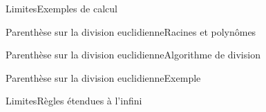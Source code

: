 \documentclass[french,t,handout,xcolor=svgnames]{beamer}
\begin{document}
\begin{frame}{Limites}{Exemples de calcul}
  
\end{frame}
\begin{frame}{Parenthèse sur la division euclidienne}{Racines et polynômes}%
  
  
\end{frame}
\begin{frame}{Parenthèse sur la division euclidienne}{Algorithme de division}
  
\end{frame}
\begin{frame}{Parenthèse sur la division euclidienne}{Exemple}
  
\end{frame}
\begin{frame}{Limites}{Règles étendues à l'infini}

\end{frame}
\end{document}
